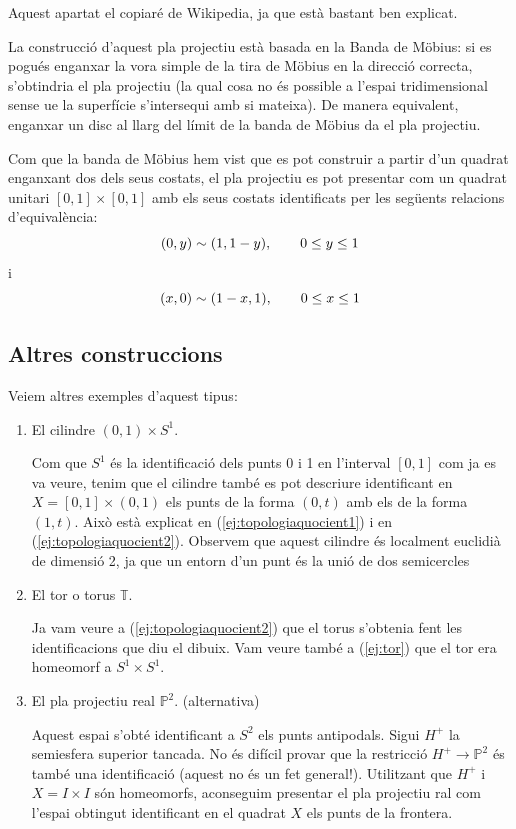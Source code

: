 \documentclass[../main.tex]{subfiles}
\begin{document}
Aquest apartat el copiaré de Wikipedia, ja que està bastant ben explicat.

La construcció d'aquest pla projectiu està basada en la Banda de Möbius: si es pogués enganxar la vora simple de la tira de Möbius en la direcció correcta, s'obtindria el pla projectiu (la qual cosa no és possible a l'espai tridimensional sense ue la superfície s'intersequi amb si mateixa). De manera equivalent, enganxar un disc al llarg del límit de la banda de Möbius da el pla projectiu.

Com que la banda de Möbius hem vist que es pot construir a partir d'un quadrat enganxant dos dels seus costats, el pla projectiu es pot presentar com un quadrat unitari $[0,1]\times[0,1]$ amb els seus costats identificats per les següents relacions d'equivalència:
\begin{equation}
    \notag
    (0,y)\sim (1,1-y),\qquad 0\leq y\leq 1
\end{equation}
i
\begin{equation}
    \notag
    (x,0)\sim(1-x,1),\qquad 0\leq x\leq 1
\end{equation}

\subsection{Altres construccions}

Veiem altres exemples d'aquest tipus:
\begin{enumerate}
    \item El cilindre $(0,1)\times S^1$.
    
    Com que $S^1$ és la identificació dels punts 0 i 1 en l'interval $[0,1]$ com ja es va veure, tenim que el cilindre també es pot descriure identificant en $X = [0,1]\times (0,1)$ els punts de la forma $(0,t)$ amb els de la forma $(1,t)$. Això està explicat en (\ref{ej:topologiaquocient1}) i en (\ref{ej:topologiaquocient2}). Observem que aquest cilindre és localment euclidià de dimensió 2, ja que un entorn d'un punt és la unió de dos semicercles
    \item El tor o torus $\mathbb{T}$.
    
    Ja vam veure a (\ref{ej:topologiaquocient2}) que el torus s'obtenia fent les identificacions que diu el dibuix. Vam veure també a (\ref{ej:tor}) que el tor era homeomorf a $S^1\times S^1$.
    \item El pla projectiu real $\mathbb{P}^2$. (alternativa)
    
    Aquest espai s'obté identificant a $S^2$ els punts antipodals. Sigui $H^+$ la semiesfera superior tancada. No és difícil provar que la restricció $H^+\rightarrow \mathbb{P}^2$ és també una identificació (aquest no és un fet general!). Utilitzant que $H^+$ i $X= I\times I$ són homeomorfs, aconseguim presentar el pla projectiu ral com l'espai obtingut identificant en el quadrat $X$ els punts de la frontera.
\end{enumerate}
\end{document}
